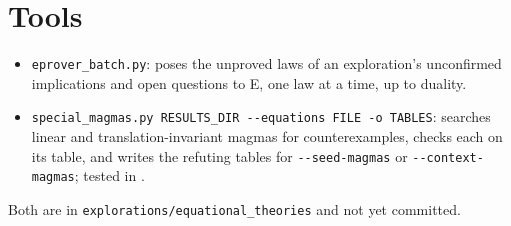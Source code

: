 \documentclass[11pt,a4paper]{article}
\newcommand{\code}[1]{\texttt{#1}}
\begin{document}
\section{Tools}

\begin{itemize}
  \item \code{eprover\_batch.py}: poses the unproved laws of an exploration's unconfirmed implications
        and open questions to E, one law at a time, up to duality.
  \item \code{special\_magmas.py RESULTS\_DIR -{}-equations FILE -o TABLES}: searches linear and
        translation-invariant magmas for counterexamples, checks each on its table, and writes the refuting
        tables for \code{-{}-seed-magmas} or \code{-{}-context-magmas}; tested in
        .
\end{itemize}
Both are in \code{explorations/equational\_theories} and not yet committed.
\end{document}
